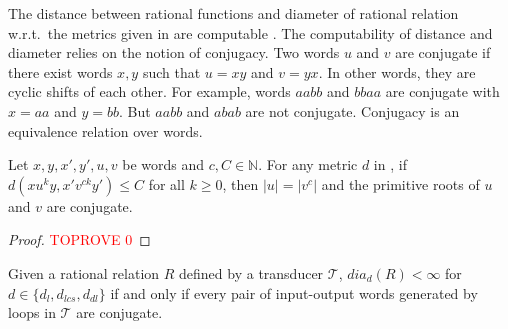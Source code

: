 \documentclass[a4paper,UKenglish,cleveref, autoref, thm-restate,authorcolumns, colorlinks]{lipics-v2021}
\newcommand\calT{\mathcal{T}}
\newcommand\dia[2]{\ensuremath{\mathit{dia}_{#2}(#1)}}
\newcommand{\dlev}{\ensuremath{d_l}}
\begin{document}
The distance between rational functions and diameter of rational relation w.r.t.~the metrics given in  are computable \cite{editdistance}. The computability of distance and diameter relies on the notion of conjugacy.  Two words $u$ and $v$ are conjugate if there exist words $x,y$ such that $u=xy$ and $v =yx$. In other words, they are cyclic shifts of each other. For example, words $aabb$ and $bbaa$ are conjugate with $x=aa$ and $y=bb$. But $aabb$ and $abab$ are not conjugate. Conjugacy is an equivalence relation over words.

\begin{proposition}\label{prop:conj}
    Let $x,y,x',y',u,v$ be words and $c,C \in \mathbb{N}$. For any metric $d$ in , if $d(xu^ky,x'v^{ck}y') \leq C$ for all $k \geq 0$, then $|u| = |v^{c}|$ and the primitive roots of $u$ and $v$ are conjugate. 
\end{proposition}

\begin{proof}\textcolor{red}{TOPROVE 0}\end{proof}


\begin{proposition}\label{prop:levboundconj}
    Given a rational relation $R$ defined by a transducer $\calT$, $\dia{R}{d} < \infty$ for $d \in \{\dlev,d_{lcs},d_{dl}\}$ if and only if every pair of input-output words generated by loops in $\calT$ are conjugate.
   
\end{proposition}
\end{document}
